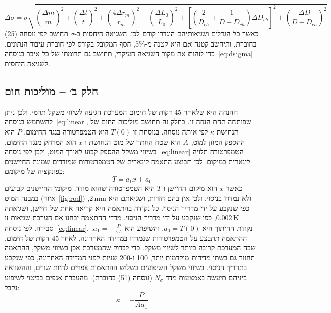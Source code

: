 \documentclass[10pt,a4paper]{article}
\newcommand{\U}[1]{\,\mathrm{#1}}
\begin{document}
\begin{equation}\label{eq:dsigma}
\Delta\sigma = \sigma\sqrt{\left(\frac{\Delta m}{m}\right)^2 + \left(\frac{\Delta t}{t}\right)^2 + \left(\frac{4\Delta r_m}{r_m}\right)^2 + \left(\frac{\Delta L_0}{L_0}\right)^2 + \left[\left(\frac{2}{D_{ch}} + \frac{1}{D - D_{ch}}\right)\Delta D_{ch}\right]^2 + \left(\frac{\Delta D}{D - D_{ch}}\right)^2}
\end{equation}
כאשר כל הגדלים ושגיאותיהם הוגדרו קודם לכן. השגיאה היחסית ב-$\sigma$ תחושב לפי נוסחה (25) בחוברת, ותיחשב קטנה אם היא קטנה מ-5\%, הסף המקובל בקורס לפי חוברת עיבוד הנתונים. כדי לזהות את מקור השגיאה העיקרי, תחושב גם תרומתו של כל איבר בנוסחה~\eqref{eq:dsigma} לשגיאה היחסית.

\subsection*{חלק ב׳ -- מוליכות חום}
ההנחה היא שלאחר 45 דקות של חימום המערכת הגיעה לשיווי משקל תרמי, ולכן ניתן להשתמש בנוסחה~\eqref{eq:linear}, שפותחה תחת הנחה זו.
בחלק זה תחושב מוליכות החום של הנחושת $\kappa$ לפי אותה נוסחה. בנוסחה זו $T(0)$ היא הטמפרטורה בנגד החימום, $P$ הוא ההספק המוזן למוט, $A$ הוא שטח החתך של מוט הנחושת ו-$x$ הוא המרחק מנגד החימום.
בשיווי משקל ההספק קבוע לאורך המוט, ולכן לפי נוסחה~\eqref{eq:linear} הטמפרטורה תלויה לינארית במיקום. לכן תבוצע התאמה לינארית של הטמפרטורות שמודדים שמונת החיישנים כפונקציה של מיקומם:
\begin{equation}\label{eq:fitb}
T = a_1 x + a_0
\end{equation}
כאשר $x$ הוא מיקום החיישן ו-$T$ היא הטמפרטורה שהוא מודד. מיקומי החיישנים קבועים במבנה המוט (איור~\ref{fig:rod}) ולא נמדדו בניסוי, ולכן אין בהם חזרות, ושגיאתם היא $2\U{mm}$, כפי שנקבע על ידי מדריך הניסוי. כל נקודה בהתאמה היא קריאה אחת של חיישן, ושגיאתה $0.002\U{K}$, כפי שנקבע על ידי מדריך הניסוי. מדדי ההתאמה יבחנו אם הערכת שגיאות זו סבירה. לפי נוסחה~\eqref{eq:linear}, נקודת החיתוך היא $a_0 = T(0)$, והשיפוע הוא $a_1 = -\frac{P}{\kappa A}$. ההתאמה תתבצע על הטמפרטורות שנמדדו במדידה האחרונה, לאחר 45 דקות של חימום, שבה המערכת קרובה ביותר לשיווי משקל. כדי לבדוק שהמערכת אכן בשיווי משקל, ההתאמה תחזור גם בשתי מדידות מוקדמות יותר, 100 ו-200 שניות לפני המדידה האחרונה, כפי שנקבע בתדריך הניסוי. בשיווי משקל השיפועים בשלוש ההתאמות צפויים להיות שווים, וההשוואה ביניהם תיעשה באמצעות מדד $N_\sigma$ (נוסחה (51) בחוברת).
מהעברת אגפים בביטוי לשיפוע נקבל:
\begin{equation}\label{eq:kappa}
\kappa = -\frac{P}{A a_1}
\end{equation}
\end{document}
